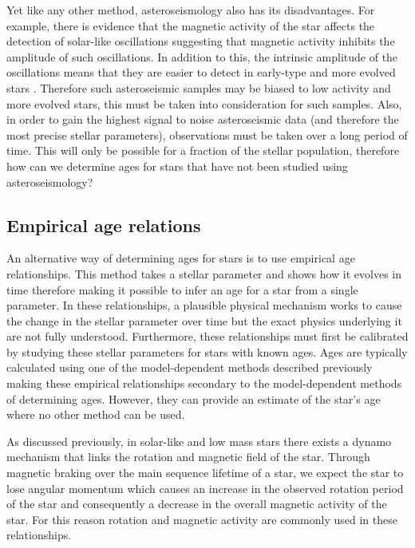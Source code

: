 Yet like any other method, asteroseismology also has its disadvantages. For example, there is evidence that the magnetic activity of the star affects the detection of solar-like oscillations \citep{Chaplin_etal_2011_stellar_activity} suggesting that magnetic activity inhibits the amplitude of such oscillations. In addition to this, the intrinsic amplitude of the oscillations means that they are easier to detect in early-type and more evolved stars \citep{Houdek_etal_1999}. Therefore such asteroseismic samples may be biased to low activity and more evolved stars, this must be taken into consideration for such samples. Also, in order to gain the highest signal to noise asteroseismic data (and therefore the most precise stellar parameters), observations must be taken over a long period of time. This will only be possible for a fraction of the stellar population, therefore how can we determine ages for stars that have not been studied using asteroseismology?

\subsection{Empirical age relations}
An alternative way of determining ages for stars is to use empirical age relationships. This method takes a stellar parameter and shows how it evolves in time therefore making it possible to infer an age for a star from a single parameter. In these relationships, a plausible physical mechanism works to cause the change in the stellar parameter over time but the exact physics underlying it are not fully understood. Furthermore, these relationships must first be calibrated by studying these stellar parameters for stars with known ages. Ages are typically calculated using one of the model-dependent methods described previously making these empirical relationships secondary to the model-dependent methods of determining ages. However, they can provide an estimate of the star's age where no other method can be used.

As discussed previously, in solar-like and low mass stars there exists a dynamo mechanism that links the rotation and magnetic field of the star. Through magnetic braking over the main sequence lifetime of a star, we expect the star to lose angular momentum which causes an increase in the observed rotation period of the star and consequently a decrease in the overall magnetic activity of the star. For this reason rotation and magnetic activity are commonly used in these relationships.

